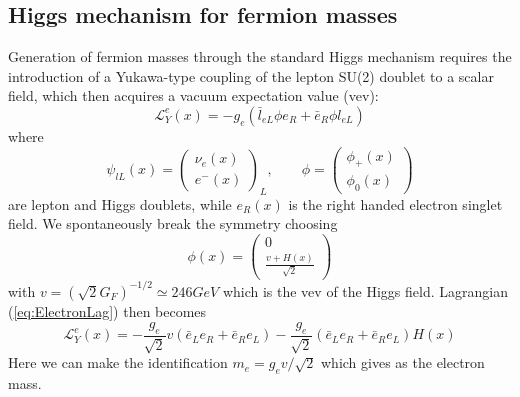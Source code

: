 \documentclass{subnucbo}
\begin{document}
\subsection{Higgs mechanism for fermion masses}
Generation of fermion masses through the standard Higgs mechanism requires the introduction of a Yukawa-type coupling of the lepton SU(2) doublet to a scalar field, which then acquires a vacuum expectation value (vev): 
\begin{equation}
\label{eq:ElectronLag}
\mathcal{L}_Y^e(x)=-g_e(\bar{l}_{eL}\phi e_R+\bar{e}_R\phi l_{eL}) %
\end{equation}
where
\begin{equation}
\psi_{lL}(x)=\begin{pmatrix}\nu_{e}(x)\\ e^-(x) \end{pmatrix}_L,\qquad
\phi=\begin{pmatrix}\phi_+(x)\\ \phi_0(x) \end{pmatrix}
\end{equation}
are lepton and Higgs doublets, while $e_R(x)$ is the right handed electron singlet field.
We spontaneously break the symmetry choosing 
\begin{equation}
\phi(x)=\begin{pmatrix}0\\ \frac{v+H(x)}{\sqrt{2}}\end{pmatrix}
\end{equation}
with $v=(\sqrt{2}G_F)^{-1/2}\simeq246GeV$ which is the vev of the Higgs field.
Lagrangian (\ref{eq:ElectronLag}) then becomes
\begin{equation}
\mathcal{L}_Y^e(x)=-\frac{g_e}{\sqrt{2}}v(\bar{e}_Le_R+\bar{e}_Re_L)-\frac{g_e}{\sqrt{2}}(\bar{e}_Le_R+\bar{e}_Re_L)H(x)
\end{equation}
Here we can make the identification $m_e=g_ev/\sqrt{2}$ which gives as the electron mass.
\end{document}
